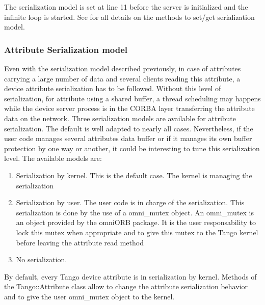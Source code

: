The serialization model is set at line 11 before the server is initialized
and the infinite loop is started. See \cite{TANGO_ref_man} for all
details on the methods to set/get serialization model.

\subsubsection{Attribute Serialization model}

Even with the serialization model described previously, in case of
attributes carrying a large number of data and several clients reading
this attribute, a device attribute serialization has to be followed.
Without this level of serialization, for attribute using a shared
buffer, a thread scheduling may happens while the device server process
is in the CORBA layer transferring the attribute data on the network.
Three serialization models are available for
attribute serialization. The default is well adapted to nearly all
cases. Nevertheless, if the user code manages several attributes data
buffer or if it manages its own buffer protection by one way or another,
it could be interesting to tune this serialization level. The available
models are:
\begin{enumerate}
\item Serialization by kernel. This is the default case. The kernel is managing
the serialization
\item Serialization by user. The user code is in charge of the serialization.
This serialization is done by the use of a omni\_mutex object. An
omni\_mutex is an object provided by the omniORB package. It is the
user responsability to lock this mutex when appropriate and to give
this mutex to the Tango kernel before leaving the attribute read method
\item No serialization.
\end{enumerate}
By default, every Tango device attribute is in serialization by kernel.
Methods of the Tango::Attribute class allow to change the attribute
serialization behavior and to give the user omni\_mutex object to
the kernel.

